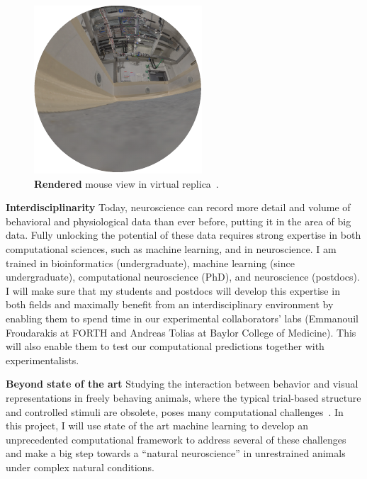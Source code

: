 \documentclass[B2,COG]{ercgrant}
\begin{document}
\begin{figure}
\vspace{-4ex}
\includegraphics[width=\linewidth]{figures/rendered.pdf}
\caption{\textbf{Rendered} mouse view in virtual replica~\parencite[from][]{Holmgren2021-jv}.}
\label{fig:replica}
\end{figure}
\textbf{Interdisciplinarity} 
Today, neuroscience can record more detail and volume  of  behavioral and physiological data than ever before, putting it in the area of big data. 
Fully unlocking the potential of these data requires strong expertise in both computational sciences, such as  machine learning, and in neuroscience. 
I am trained in bioinformatics (undergraduate), machine learning (since undergraduate), computational neuroscience (PhD), and neuroscience (postdocs).
I will make sure that my students and postdocs will develop this expertise in both fields and maximally benefit from an interdisciplinary environment by enabling them to spend time in our experimental collaborators’ labs (Emmanouil Froudarakis at FORTH and Andreas Tolias at Baylor College of Medicine).
This will also enable them to test our computational predictions together with experimentalists.


\textbf{Beyond state of the art} 
Studying the interaction between behavior and visual representations in freely behaving animals, where the typical trial-based structure and controlled stimuli are obsolete, poses many computational challenges~\parencite{Busse2017-rt}.
In this project, I will use state of the art machine learning to develop an unprecedented computational framework to address several of these challenges and make a big step towards a ``natural neuroscience'' in unrestrained animals under complex natural conditions.
\end{document}
